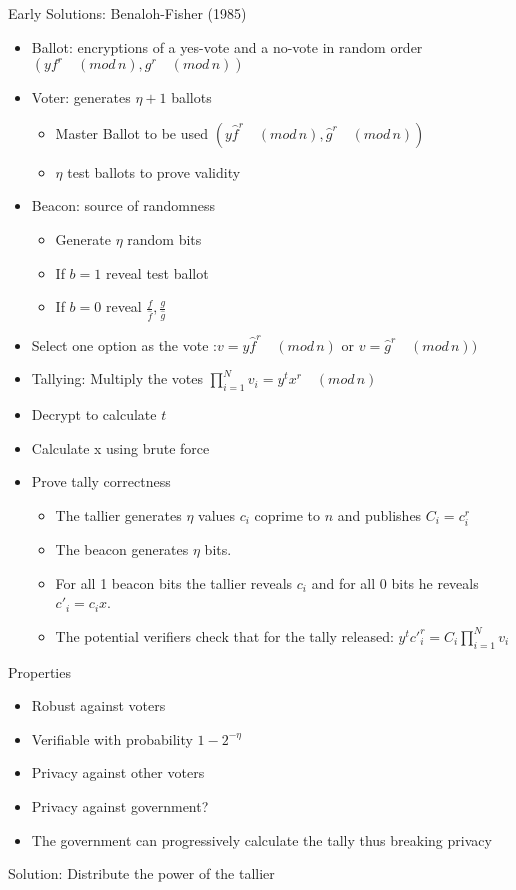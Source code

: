 \documentclass{beamer}
\newcommand{\md}[1]{\quad (mod \, {#1})}
\begin{document}
\begin{frame}[allowframebreaks]{Early Solutions: Benaloh-Fisher (1985) \cite{CF85}}
\begin{itemize}
\item Ballot: encryptions of a yes-vote and a no-vote in random order $(yf^r \md{n}, g^r \md{n})$
\item Voter: generates $\eta+1$ ballots
\begin{itemize}
	\item Master Ballot to be used $(y\hat{f}^r \md{n}, \hat{g}^r \md{n})$
	\item $\eta$ test ballots to prove validity
\end{itemize}
\item Beacon: source of randomness
\begin{itemize}
	\item Generate $\eta$ random bits
	\item If $b=1$ reveal test ballot
	\item If $b=0$ reveal $\frac{f}{\hat{f}},\frac{g}{\hat{g}}$
\end{itemize}
\item Select one option as the vote :$v = y\hat{f}^r \md{n}$ or $v = \hat{g}^r \md{n})$
\framebreak
\item Tallying: Multiply the votes
$\prod_{i=1}^N v_i = y^t x^r \md{n}$ 
\item Decrypt to calculate $t$
\item Calculate x using brute force
\item Prove tally correctness
\begin{itemize}
\item The tallier generates $\eta$ values $c_i$ coprime to $n$ and publishes $C_i = c_{i}^{r}$
\item The beacon generates $\eta$ bits.
\item For all 1 beacon bits the tallier reveals $c_i$ and for all 0 bits he reveals $c'_i = c_i x$. 
\item The potential verifiers check that for the tally released: 
$y^t {c'}_i^{r} = C_i \prod_{i=1}^N v_i$
\end{itemize}
\end{itemize}
\framebreak
Properties
\begin{itemize}
\item Robust against voters
\item Verifiable with probability $1-2^{-\eta}$
\item Privacy against other voters
\item Privacy against government?
\item The government can progressively calculate the tally thus breaking privacy
\end{itemize}
Solution: Distribute the power of the tallier
\end{frame}
\end{document}
